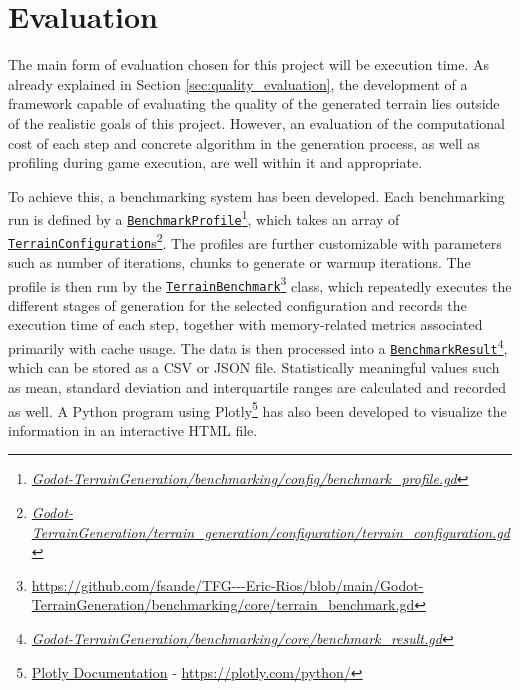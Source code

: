 \chapter{Evaluation} \label{chap:Evaluation}

The main form of evaluation chosen for this project will be execution time. 
As already explained in Section \ref{sec:quality_evaluation}, the development of a framework capable of evaluating the quality of the generated terrain lies outside of the realistic goals of this project.
However, an evaluation of the computational cost of each step and concrete algorithm in the generation process, as well as profiling during game execution, are well within it and appropriate. 

To achieve this, a benchmarking system has been developed.
Each benchmarking run is defined by a \href{{https://github.com/fsande/TFG---Eric-Rios/blob/main/Godot-TerrainGeneration/benchmarking/config/benchmark_profile.gd}}{\texttt{BenchmarkProfile}}\footnote{\href{{https://github.com/fsande/TFG---Eric-Rios/blob/main/Godot-TerrainGeneration/benchmarking/config/benchmark_profile.gd}}{\textit{Godot-TerrainGeneration/benchmarking/config/benchmark\_profile.gd}}}, which takes an array of \href{{https://github.com/fsande/TFG---Eric-Rios/blob/main/Godot-TerrainGeneration/terrain_generation/configuration/terrain_configuration.gd}}{\texttt{TerrainConfiguration}s}\footnote{\href{{https://github.com/fsande/TFG---Eric-Rios/blob/main/Godot-TerrainGeneration/terrain_generation/configuration/terrain_configuration.gd}}{\textit{Godot-TerrainGeneration/terrain\_generation/configuration/terrain\_configuration.gd}}}. 
The profiles are further customizable with parameters such as number of iterations, chunks to generate or warmup iterations.
The profile is then run by the \href{https://github.com/fsande/TFG---Eric-Rios/blob/main/Godot-TerrainGeneration/benchmarking/core/terrain_benchmark.gd}{\texttt{TerrainBenchmark}}\footnote{\url{https://github.com/fsande/TFG---Eric-Rios/blob/main/Godot-TerrainGeneration/benchmarking/core/terrain_benchmark.gd}} class, which repeatedly executes the different stages of generation for the selected configuration and records the execution time of each step, together with memory-related metrics associated primarily with cache usage.
The data is then processed into a \href{{https://github.com/fsande/TFG---Eric-Rios/blob/main/Godot-TerrainGeneration/benchmarking/core/benchmark_result.gd}}{\texttt{BenchmarkResult}}\footnote{\href{{https://github.com/fsande/TFG---Eric-Rios/blob/main/Godot-TerrainGeneration/benchmarking/core/benchmark_result.gd}}{\textit{Godot-TerrainGeneration/benchmarking/core/benchmark\_result.gd}}}, which can be stored as a CSV or JSON file.
Statistically meaningful values such as mean, standard deviation and interquartile ranges are calculated and recorded as well.
A Python program using Plotly\footnote{\href{https://plotly.com/python/}{Plotly Documentation} - \url{https://plotly.com/python/}} has also been developed to visualize the information in an interactive HTML file.

